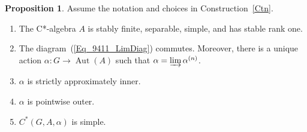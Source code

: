 \documentclass[10pt]{amsart}
\newcounter{TmpEnumi}
\numberwithin{equation}{section}
\theoremstyle{definition}
\newtheorem{prp}[thm]{Proposition}
\newcommand{\af}{\alpha}
\newcommand{\Aut}{{\operatorname{Aut}}}
\newcommand{\dirlim}{\varinjlim}
\begin{document}
%
\begin{prp}\label{L_af_proper}
Assume the notation and choices in Construction~\ref{Ctn}.
\begin{enumerate}
\item\label{L_af_proper.a}
 The C*-algebra $A$ is stably finite, separable, simple, and has stable rank one.
%
\item\label{L_af_proper.b}
The diagram~(\ref{Eq_9411_LimDiag}) commutes. Moreover,
there is a unique action $\alpha\colon G \to \Aut (A)$ such that $\af = \dirlim \af^{(n)}$. 
\item\label{L_af_proper.c}
$\alpha$ is strictly approximately  inner. 
\item\label{L_af_proper.c'}
$\alpha$ is  pointwise outer. 
\item\label{L_af_proper.d}
$C^*(G, A, \alpha)$ is simple.
%
\setcounter{TmpEnumi}{\value{enumi}}
\end{enumerate}
\end{prp}
%
\end{document}
